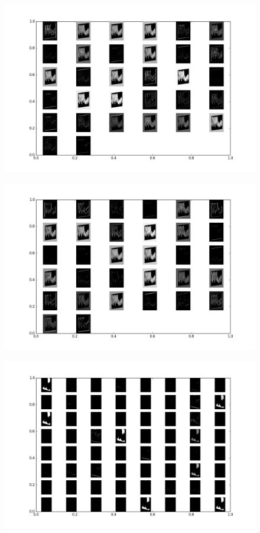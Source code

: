 \documentclass[a4paper,11pt]{article}
\begin{document}
\begin{figure}
\centering
\includegraphics[width=5.00in]{layer1_mp.png}
\end{figure}


\begin{figure}
\centering
\includegraphics[width=5.00in]{layer2_act.png}
\end{figure}

\begin{figure}
\centering
\includegraphics[width=5.00in]{layer3_act.png}
\end{figure}
\end{document}
